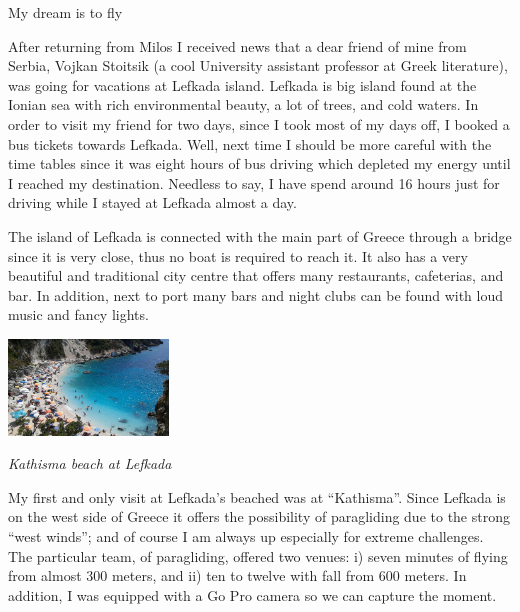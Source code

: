 \documentclass[10pt,a4paper]{article} %
\newcommand{\NewsItem}[1]{ %
\usefont{T1}{fvs}{n}{n} %
\vspace{24pt}\large #1\vspace{3pt} %
\par \normalsize \normalfont}
\begin{document}
\begin{multicols}{3}
\NewsItem{My dream is to fly}

After returning from Milos I received news that a dear friend of mine from Serbia, 
Vojkan Stoitsik (a cool University assistant professor at Greek literature), 
was going for vacations at Lefkada island. 
Lefkada is big island found at the Ionian sea with rich environmental beauty, a lot 
of trees, and cold waters.
In order to visit my friend for two days, since I took most of my days off, I 
booked a bus tickets towards Lefkada. 
Well, next time I should be more careful with the time tables since it was eight hours 
of bus driving which depleted my energy until I reached my destination. 
Needless to say, I have spend around 16 hours just for driving while I stayed at 
Lefkada almost a day. 


The island of Lefkada is connected with the main part of Greece through a bridge 
since it is very close, thus no boat is required to reach it. 
It also has a very beautiful and traditional city centre that offers many 
restaurants, cafeterias, and bar. 
In addition, next to port many bars and night clubs can be found with loud 
music and fancy lights. 

\begin{center}
	\includegraphics[width=0.32\textwidth]{media/kathisma_beach.jpg}
	\par\textit{Kathisma beach at Lefkada}
\end{center}


My first and only visit at Lefkada's beached was at ``Kathisma''. 
Since Lefkada is on the west side of Greece it offers the possibility of 
paragliding due to the strong ``west winds''; and of course I am always up 
especially for extreme challenges. 
The particular team, of paragliding, offered two venues: i) seven minutes of flying 
from almost 300 meters, and ii) ten to twelve with fall from 600 meters. 
In addition, I was equipped with a Go Pro camera so we can capture the moment. 



\end{multicols}
\end{document}
